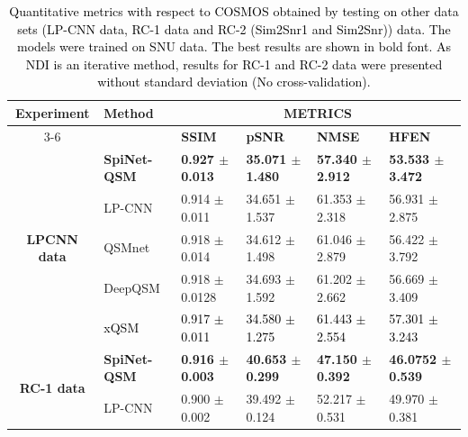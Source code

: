 \documentclass[sn-vancouver,Numbered]{sn-jnl}%
\begin{document}
\begin{table}[htbp]

\centering
\caption{\textcolor{black}{Quantitative metrics with respect to COSMOS obtained by testing on other data sets (LP-CNN data, RC-1 data and RC-2 (Sim2Snr1 and Sim2Snr)) data\cite{qsm2021qsm}. The models were trained on SNU data. The best results are shown in bold font. As NDI is an iterative method, results for RC-1 and RC-2 data were presented without standard deviation (No cross-validation). }}
{\small

\begin{tabular}{clllll}
\hline
\multirow{2}{*}{\textbf{Experiment}}
&\multirow{2}{*}{\textbf{Method}} 
&\multicolumn{4}{c}{\textbf{METRICS}} \\ \cmidrule{3-6}
&                       
& \textbf{SSIM}     
& \textbf{pSNR}         
& \textbf{NMSE}       
&\textbf{HFEN}  \\ \hline
\multirow{5}{*}{\textbf{LPCNN data}}        
& \textbf{SpiNet-QSM}   
&\textbf{0.927 $\pm$ 0.013}	    
&\textbf{35.071 $\pm$ 1.480}	    
&\textbf{57.340 $\pm$ 2.912}	  
&\textbf{53.533 $\pm$ 3.472} \\ 

& LP-CNN                
&0.914 $\pm$ 0.011              
&34.651 $\pm$ 1.537	              
&61.353 $\pm$ 2.318                 
&56.931 $\pm$ 2.875\\ 
& QSMnet                
&0.918 $\pm$ 0.014	      
&34.612 $\pm$ 1.498	     
&61.046 $\pm$ 2.879         
&56.422 $\pm$ 3.792\\ 
& DeepQSM               
&0.918 $\pm$ 0.0128	     
&34.693 $\pm$ 1.592
&61.202 $\pm$ 2.662
&56.669 $\pm$ 3.409\\ 

&\textcolor{black}{ xQSM}               
&\textcolor{black}{0.917 $\pm$ 0.011}	     
&\textcolor{black}{34.580 $\pm$ 1.275}
&\textcolor{black}{61.443 $\pm$ 2.554}
&\textcolor{black}{57.301 $\pm$ 3.243}\\ 



\hline

\multirow{6}{*}{\textbf{RC-1 data}}     
&\textbf{SpiNet-QSM}    
&\textbf{0.916 $\pm$ 0.003}	    
&\textbf{40.653 $\pm$ 0.299}	    
&\textbf{47.150 $\pm$ 0.392}      
&\textbf{46.0752 $\pm$ 0.539}\\  

& LP-CNN                
&0.900 $\pm$ 0.002	    
&39.492 $\pm$ 0.124
&52.217 $\pm$ 0.531	  
&49.970 $\pm$ 0.381\\ 


\end{tabular}}
\end{table}
\end{document}
